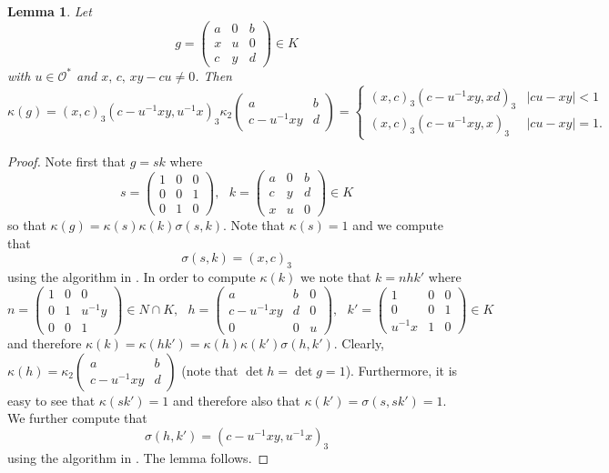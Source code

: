 \documentclass[12pt]{amsart}
\newcommand{\abs}[1]{\left|{#1}\right|}
\renewcommand{\O}{\mathcal{O}}
\newcommand{\sm}[4]{\left(\begin{smallmatrix}{#1}&{#2}\\{#3}&{#4}\end{smallmatrix}\right)}
\newtheorem{lemma}[theorem]{Lemma}
\theoremstyle{remark}
\begin{document}
\begin{lemma}\label{lem k comp 22}
Let 
\[
g=\begin{pmatrix}  a &0 & b \\ x & u &  0\\  c & y & d  \end{pmatrix}\in K
\]
with $u\in \O^*$ and  $x,\,c,\,xy-cu\ne 0$. Then 
\[
\kappa(g)=(x,c)_3(c-u^{-1}xy,u^{-1}x)_3  \kappa_2\sm{a}{b}{c-u^{-1}xy}{d} =\begin{cases} (x,c)_3(c-u^{-1}xy,xd)_3 & \abs{cu-xy}<1 \\  (x,c)_3(c-u^{-1}xy,x)_3 & \abs{cu-xy}=1. \end{cases}
\]
\end{lemma}
\begin{proof} 
Note first that $g=sk$ where
\[
s=\begin{pmatrix}  1 &0 &0 \\ 0 & 0& 1\\  0& 1 &0  \end{pmatrix}, \ \ \ k=\begin{pmatrix} a & 0 & b \\  c & y &d \\ x & u & 0 \end{pmatrix} \in K
\]
so that $\kappa(g)=\kappa(s)\kappa(k)\sigma(s,k)$. Note that $\kappa(s)=1$ and we compute that
\[
\sigma(s,k)=(x,c)_3 
\]
using the algorithm in \cite[\S 2]{MR904946}.
In order to compute $\kappa(k)$ we note that $k=nhk'$ where
\[
n=\begin{pmatrix}  1 &0  & 0\\ 0 & 1 & u^{-1}y\\   0 &0 & 1 \end{pmatrix}\in N\cap K,\ \ \ h=\begin{pmatrix}   a & b & 0  \\ c-u^{-1}xy & d & 0 \\ 0 & 0 & u \end{pmatrix},  \ \ \ k'=\begin{pmatrix}  1 & 0 & 0  \\  0 & 0 & 1 \\ u^{-1}x  & 1 & 0 \end{pmatrix} \in K
\]
and therefore $\kappa(k)=\kappa(hk')=\kappa(h)\kappa(k')\sigma(h,k')$.
Clearly, $\kappa(h)=\kappa_2\sm{a}{b}{c-u^{-1}xy}{d}$ (note that $\det h=\det g=1$). Furthermore, it is easy to see that $\kappa(sk')=1$ and therefore also that $\kappa(k')=\sigma(s,sk')=1$. 
We further compute that 
\[
\sigma(h,k')=(c-u^{-1}xy,u^{-1}x)_3   
\] 
using the algorithm in \cite[\S 2]{MR904946}.
The lemma follows.
\end{proof}
\end{document}
